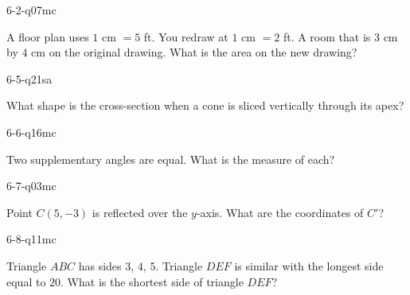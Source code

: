 \begin{practiceQuestion}{6-2-q07}{mc}
\begin{questionText}
A floor plan uses $1$ cm $= 5$ ft. You redraw at $1$ cm $= 2$ ft. A room that is $3$ cm by $4$ cm on the original drawing. What is the area on the new drawing?
\end{questionText}
\end{practiceQuestion}

\begin{practiceQuestion}{6-5-q21}{sa}
\begin{questionText}
What shape is the cross-section when a cone is sliced vertically through its apex?
\end{questionText}
\end{practiceQuestion}

\begin{practiceQuestion}{6-6-q16}{mc}
\begin{questionText}
Two supplementary angles are equal. What is the measure of each?
\end{questionText}
\end{practiceQuestion}

\begin{practiceQuestion}{6-7-q03}{mc}
\begin{questionText}
Point $C(5, -3)$ is reflected over the $y$-axis. What are the coordinates of $C'$?
\end{questionText}
\end{practiceQuestion}

\begin{practiceQuestion}{6-8-q11}{mc}
\begin{questionText}
Triangle $ABC$ has sides $3$, $4$, $5$. Triangle $DEF$ is similar with the longest side equal to $20$. What is the shortest side of triangle $DEF$?
\end{questionText}
\end{practiceQuestion}


